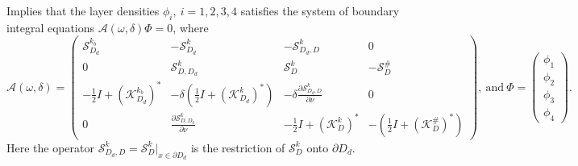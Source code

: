 \documentclass[a4paper]{article}
\theoremstyle{definition}
\newcommand{\A}{\mathcal{A}}
\newcommand{\Scrystal}{\mathcal{S}_D^\#}
\newcommand{\KstarC}{(\mathcal{K}_D^{\#})^*}
\begin{document}
Implies that the layer densities $\phi_i,\ i=1,2,3,4$ satisfies the system of boundary integral equations $\A(\omega, \delta)\Phi = 0$, where
\begin{equation} \label{eq:A}
\A(\omega, \delta) = 
\begin{pmatrix}
\mathcal{S}_{D_d}^{k_b} &  -\mathcal{S}_{D_d}^{k} & -\mathcal{S}_{D_d,D}^{k} & 0 \\
0 & \mathcal{S}_{D,D_d}^k & \mathcal{S}_{D}^k & -\Scrystal \\
-\frac{1}{2}I+ (\mathcal{K}_{D_d}^{k_b})^*& -\delta\left( \frac{1}{2}I+ (\mathcal{K}_{D_d}^{k})^*\right) & -\delta \frac{\partial \mathcal{S}_{D_d,D}^{k}}{\partial \nu} & 0 \\
0 & \frac{\partial \mathcal{S}_{D,D_d}^{k}}{\partial \nu} & -\frac{1}{2}I+ (\mathcal{K}_D^{k})^* & -\left( \frac{1}{2}I+ \KstarC\right)
\end{pmatrix}, 
\ \text{and}  \ \Phi= 
\begin{pmatrix}
\phi_1\\
\phi_2 \\
\phi_3 \\
\phi_4
\end{pmatrix}.
\end{equation}
Here the operator $\mathcal{S}_{D_d,D}^{k} = \mathcal{S}_{D}^{k}|_{x\in \partial D_d}$ is the restriction of $\mathcal{S}_{D}^{k}$ onto $\partial D_d$.
\end{document}
